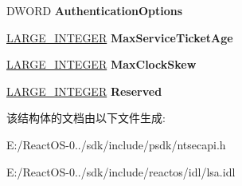 \begin{DoxyCompactItemize}
D\+W\+O\+RD {\bfseries Authentication\+Options}
\item 
\mbox{\label{struct___p_o_l_i_c_y___d_o_m_a_i_n___k_e_r_b_e_r_o_s___t_i_c_k_e_t___i_n_f_o_a6400e1e91dfcdbb8ec07cc2f4dedae74}} 
\hyperlink{union___l_a_r_g_e___i_n_t_e_g_e_r}{L\+A\+R\+G\+E\+\_\+\+I\+N\+T\+E\+G\+ER} {\bfseries Max\+Service\+Ticket\+Age}
\item 
\mbox{\label{struct___p_o_l_i_c_y___d_o_m_a_i_n___k_e_r_b_e_r_o_s___t_i_c_k_e_t___i_n_f_o_a136497746b538a9a7f467d98550e2364}} 
\hyperlink{union___l_a_r_g_e___i_n_t_e_g_e_r}{L\+A\+R\+G\+E\+\_\+\+I\+N\+T\+E\+G\+ER} {\bfseries Max\+Clock\+Skew}
\item 
\mbox{\label{struct___p_o_l_i_c_y___d_o_m_a_i_n___k_e_r_b_e_r_o_s___t_i_c_k_e_t___i_n_f_o_a8cfce19c3e26c85f49ccb1e0e83d991c}} 
\hyperlink{union___l_a_r_g_e___i_n_t_e_g_e_r}{L\+A\+R\+G\+E\+\_\+\+I\+N\+T\+E\+G\+ER} {\bfseries Reserved}
\end{DoxyCompactItemize}


该结构体的文档由以下文件生成\+:\begin{DoxyCompactItemize}
\item 
E\+:/\+React\+O\+S-\/0../sdk/include/psdk/ntsecapi.\+h\item 
E\+:/\+React\+O\+S-\/0../sdk/include/reactos/idl/lsa.\+idl\end{DoxyCompactItemize}
